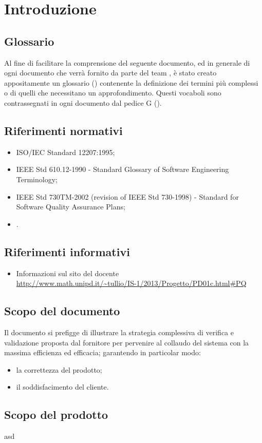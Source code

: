 \section{Introduzione}
\subsection{Glossario}
Al fine di facilitare la comprensione del seguente documento, ed in generale di ogni documento che verrà fornito da parte del team \gruppo , è stato creato appositamente un glossario (\textit{\Glossario}) contenente la definizione dei termini più complessi o di quelli che necessitano un approfondimento. Questi vocaboli sono contrassegnati in ogni documento dal pedice G ().
\subsection{Riferimenti normativi}
\begin{itemize}
\item ISO/IEC Standard 12207:1995;
\item IEEE Std 610.12-1990 - Standard Glossary of Software Engineering Terminology;
\item IEEE Std 730TM-2002 (revision of IEEE Std 730-1998) - Standard for Software Quality Assurance Plans;
\item \infoNDP .
\end{itemize}
\subsection{Riferimenti informativi}
\begin{itemize}
\item Informazioni sul sito del docente \\
\url{http://www.math.unipd.it/~tullio/IS-1/2013/Progetto/PD01c.html#PQ}
\end{itemize}
\subsection{Scopo del documento}
Il documento si prefigge di illustrare la strategia complessiva di verifica e validazione proposta dal fornitore per pervenire al collaudo del sistema con la massima efficienza ed efficacia; garantendo in particolar modo:\\
\begin{itemize}
\item la correttezza del prodotto;
\item il soddisfacimento del cliente.
\end{itemize}
\subsection{Scopo del prodotto}
asd\\
